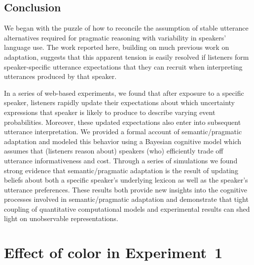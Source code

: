 \documentclass[man, floatsintext]{apa6}
\begin{document}
\subsection{Conclusion}

We began with the puzzle of how to reconcile the assumption of stable utterance alternatives required for pragmatic reasoning with variability in speakers'  language use. The work reported here, building on much previous work on adaptation, suggests that this apparent tension is easily resolved if listeners form speaker-specific utterance expectations that they can recruit when interpreting utterances produced by that speaker.

In a series of web-based experiments, we found that after exposure to a specific speaker, listeners rapidly update 
their expectations about which uncertainty expressions that speaker is likely to produce
to describe varying event probabilities. Moreover, these updated expectations also enter into subsequent utterance interpretation.
We provided a formal account of semantic/pragmatic adaptation and modeled this behavior using a Bayesian cognitive model 
which assumes that (listeners reason about) speakers (who) efficiently trade off utterance informativeness and cost.
Through a series of simulations we found strong evidence that semantic/pragmatic adaptation is the result of
updating beliefs about both a specific speaker's underlying lexicon as well as the speaker's utterance
preferences. These results both provide new insights into the cognitive processes involved in semantic/pragmatic adaptation
and demonstrate that tight coupling of quantitative computational models and experimental results can shed light on
unobservable representations.

\printbibliography


\appendix
\renewcommand{\thesection}{\Alph{section}}

\section{Effect of color in Experiment~1}
\setcounter{section}{1}
\end{document}
